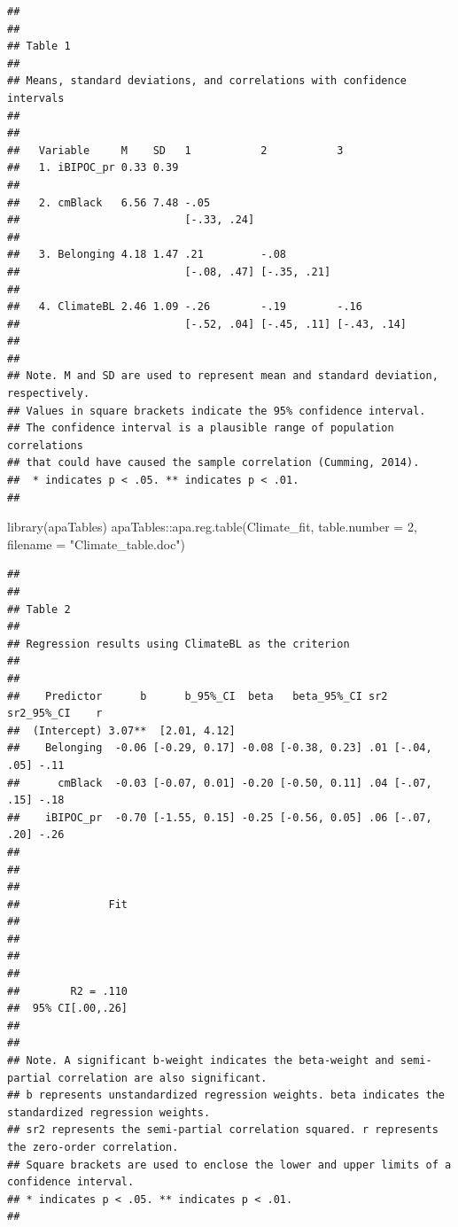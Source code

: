 \documentclass[
  11pt,
]{book}
\newenvironment{Shaded}{\begin{snugshade}}{\end{snugshade}}
\newcommand{\AttributeTok}[1]{\textcolor[rgb]{0.77,0.63,0.00}{#1}}
\newcommand{\DecValTok}[1]{\textcolor[rgb]{0.00,0.00,0.81}{#1}}
\newcommand{\FunctionTok}[1]{\textcolor[rgb]{0.00,0.00,0.00}{#1}}
\newcommand{\NormalTok}[1]{#1}
\newcommand{\SpecialCharTok}[1]{\textcolor[rgb]{0.00,0.00,0.00}{#1}}
\newcommand{\StringTok}[1]{\textcolor[rgb]{0.31,0.60,0.02}{#1}}
\begin{document}
\begin{verbatim}
## 
## 
## Table 1 
## 
## Means, standard deviations, and correlations with confidence intervals
##  
## 
##   Variable     M    SD   1           2           3          
##   1. iBIPOC_pr 0.33 0.39                                    
##                                                             
##   2. cmBlack   6.56 7.48 -.05                               
##                          [-.33, .24]                        
##                                                             
##   3. Belonging 4.18 1.47 .21         -.08                   
##                          [-.08, .47] [-.35, .21]            
##                                                             
##   4. ClimateBL 2.46 1.09 -.26        -.19        -.16       
##                          [-.52, .04] [-.45, .11] [-.43, .14]
##                                                             
## 
## Note. M and SD are used to represent mean and standard deviation, respectively.
## Values in square brackets indicate the 95% confidence interval.
## The confidence interval is a plausible range of population correlations 
## that could have caused the sample correlation (Cumming, 2014).
##  * indicates p < .05. ** indicates p < .01.
## 
\end{verbatim}

\begin{Shaded}
\begin{Highlighting}[]
\FunctionTok{library}\NormalTok{(apaTables)}
\NormalTok{apaTables}\SpecialCharTok{::}\FunctionTok{apa.reg.table}\NormalTok{(Climate\_fit, }\AttributeTok{table.number =} \DecValTok{2}\NormalTok{, }\AttributeTok{filename =} \StringTok{"Climate\_table.doc"}\NormalTok{)}
\end{Highlighting}
\end{Shaded}

\begin{verbatim}
## 
## 
## Table 2 
## 
## Regression results using ClimateBL as the criterion
##  
## 
##    Predictor      b      b_95%_CI  beta   beta_95%_CI sr2  sr2_95%_CI    r
##  (Intercept) 3.07**  [2.01, 4.12]                                         
##    Belonging  -0.06 [-0.29, 0.17] -0.08 [-0.38, 0.23] .01 [-.04, .05] -.11
##      cmBlack  -0.03 [-0.07, 0.01] -0.20 [-0.50, 0.11] .04 [-.07, .15] -.18
##    iBIPOC_pr  -0.70 [-1.55, 0.15] -0.25 [-0.56, 0.05] .06 [-.07, .20] -.26
##                                                                           
##                                                                           
##                                                                           
##              Fit
##                 
##                 
##                 
##                 
##        R2 = .110
##  95% CI[.00,.26]
##                 
## 
## Note. A significant b-weight indicates the beta-weight and semi-partial correlation are also significant.
## b represents unstandardized regression weights. beta indicates the standardized regression weights. 
## sr2 represents the semi-partial correlation squared. r represents the zero-order correlation.
## Square brackets are used to enclose the lower and upper limits of a confidence interval.
## * indicates p < .05. ** indicates p < .01.
## 
\end{verbatim}
\end{document}
